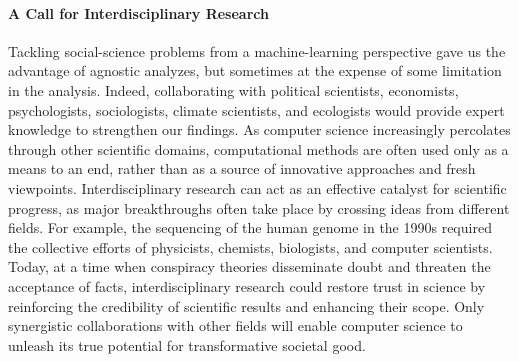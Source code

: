 \paragraph{A Call for Interdisciplinary Research}

Tackling social-science problems from a machine-learning perspective gave us the advantage of agnostic analyzes, but sometimes at the expense of some limitation in the analysis.
Indeed, collaborating with political scientists, economists, psychologists, sociologists, climate scientists, and ecologists would provide expert knowledge to strengthen our findings.
As computer science increasingly percolates through other scientific domains, computational methods are often used only as a means to an end, rather than as a source of innovative approaches and fresh viewpoints.
Interdisciplinary research can act as an effective catalyst for scientific progress, as major breakthroughs often take place by crossing ideas from different fields.
For example, the sequencing of the human genome in the 1990s required the collective efforts of physicists, chemists, biologists, and computer scientists.
Today, at a time when conspiracy theories disseminate doubt and threaten the acceptance of facts, interdisciplinary research could restore trust in science by reinforcing the credibility of scientific results and enhancing their scope.
Only synergistic collaborations with other fields will enable computer science to unleash its true potential for transformative societal good.
